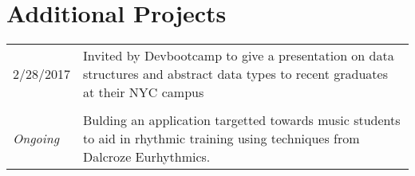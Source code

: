 \documentclass[a4paper,11pt]{article}
\begin{document}
\section{Additional Projects}
\begin{tabularx}{\textwidth}{@{}p{6em}|X@{}}
    2/28/2017 & Invited by Devbootcamp to give a presentation on data structures and abstract data types to recent graduates at their NYC campus \\
    \multicolumn{2}{c}{} \\
    \textit{Ongoing} & Bulding an application targetted towards music students to aid in rhythmic training using techniques from Dalcroze Eurhythmics. \\
\end{tabularx}
\end{document}
